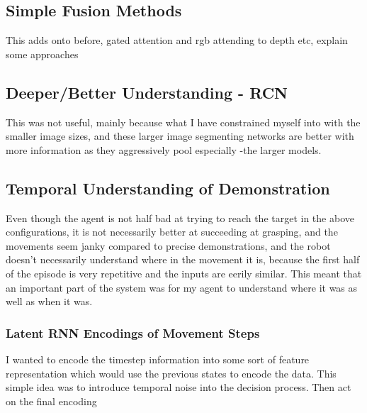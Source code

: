 \subsection{Simple Fusion Methods}
This adds onto before, gated attention and rgb attending to depth etc, explain some approaches

\subsection{Deeper/Better Understanding - RCN}
This was not useful, mainly because what I have constrained myself into with the smaller image sizes, and these larger image segmenting networks are better with more information as they aggressively pool especially -the larger models. 

\subsection{Temporal Understanding of Demonstration}
Even though the agent is not half bad at trying to reach the target in the above configurations, it is not necessarily better at succeeding at grasping, and the movements seem janky compared to precise demonstrations, and the robot doesn't necessarily understand where in the movement it is, because the first half of the episode is very repetitive and the inputs are eerily similar. This meant that an important part of the system was for my agent to understand where it was as well as when it was.

\subsubsection{Latent RNN Encodings of Movement Steps}
I wanted to encode the timestep information into some sort of feature representation which would use the previous states to encode the data. This simple idea was to introduce temporal noise into the decision process. Then act on the final encoding




